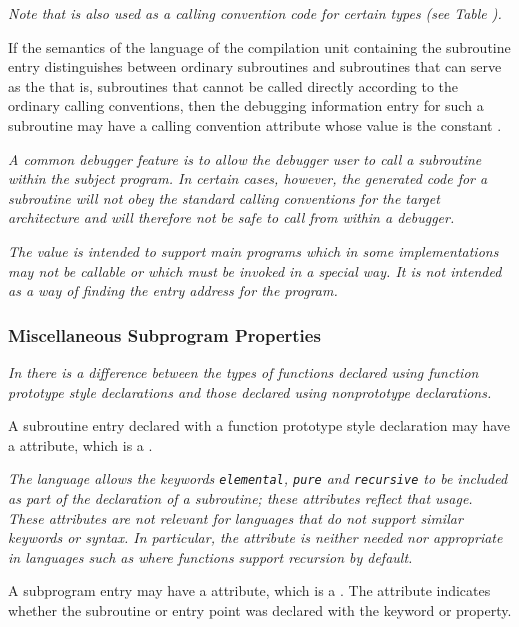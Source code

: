\textit{Note that \DWCCnormal{} is also used as a calling convention 
code for certain types 
(see Table ).}

If the semantics of the language of the compilation unit
containing the subroutine entry distinguishes between ordinary
subroutines and subroutines that can serve as the  that is, subroutines that cannot be called
directly according to the ordinary calling conventions,
then the debugging information entry for such a subroutine
may have a calling convention attribute whose value is the
constant \DWCCprogramTARG.

\textit{A common debugger feature is to allow the debugger user to call
a subroutine within the subject program. In certain cases,
however, the generated code for a subroutine will not obey
the standard calling conventions for the target architecture
and will therefore not be safe to call from within a debugger.}

\textit{The \DWCCprogram{} 
value is intended to support  main
programs which in some implementations may not be callable
or which must be invoked in a special way. It is not intended
as a way of finding the entry address for the program.}


\subsubsection{Miscellaneous Subprogram Properties}
\textit{In 
there is a difference between the types of functions
declared using function prototype style declarations and
those declared using non\dash prototype declarations.}

A subroutine entry declared with a function prototype style
declaration may have 
a 
\DWATprototypedNAME{} attribute, which is
a \CLASSflag.

\textit{The  
language allows the keywords \texttt{elemental}, \texttt{pure}
and \texttt{recursive} to be included as part of the declaration of
a subroutine; these attributes reflect that usage. These
attributes are not relevant for languages that do not support
similar keywords or syntax. In particular, the \DWATrecursiveNAME{}
attribute is neither needed nor appropriate in languages such
as  
where functions support recursion by default.
}

A subprogram entry may have a 
\hypertarget{chap:DWATelementalelementalpropertyofasubroutine}{}
\DWATelementalDEFN{} attribute, 
which is a . 
The attribute indicates whether the subroutine
or entry point was declared with the  keyword
or property.

